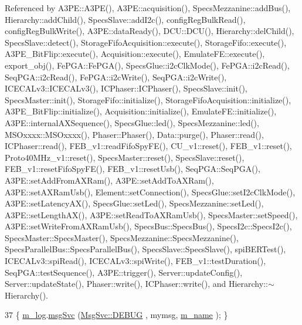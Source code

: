 Referenced by A3\+P\+E\+::\+A3\+P\+E(), A3\+P\+E\+::acquisition(), Specs\+Mezzanine\+::add\+Bus(), Hierarchy\+::add\+Child(), Specs\+Slave\+::add\+I2c(), config\+Reg\+Bulk\+Read(), config\+Reg\+Bulk\+Write(), A3\+P\+E\+::data\+Ready(), D\+C\+U\+::\+D\+C\+U(), Hierarchy\+::del\+Child(), Specs\+Slave\+::detect(), Storage\+Fifo\+Acquisition\+::execute(), Storage\+Fifo\+::execute(), A3\+P\+E\+\_\+\+Bit\+Flip\+::execute(), Acquisition\+::execute(), Emulate\+F\+E\+::execute(), export\+\_\+obj(), Fe\+P\+G\+A\+::\+Fe\+P\+G\+A(), Specs\+Glue\+::i2c\+Clk\+Mode(), Fe\+P\+G\+A\+::i2c\+Read(), Seq\+P\+G\+A\+::i2c\+Read(), Fe\+P\+G\+A\+::i2c\+Write(), Seq\+P\+G\+A\+::i2c\+Write(), I\+C\+E\+C\+A\+Lv3\+::\+I\+C\+E\+C\+A\+Lv3(), I\+C\+Phaser\+::\+I\+C\+Phaser(), Specs\+Slave\+::init(), Specs\+Master\+::init(), Storage\+Fifo\+::initialize(), Storage\+Fifo\+Acquisition\+::initialize(), A3\+P\+E\+\_\+\+Bit\+Flip\+::initialize(), Acquisition\+::initialize(), Emulate\+F\+E\+::initialize(), A3\+P\+E\+::internal\+A\+X\+Sequence(), Specs\+Glue\+::led(), Specs\+Mezzanine\+::led(), M\+S\+Oxxxx\+::\+M\+S\+Oxxxx(), Phaser\+::\+Phaser(), Data\+::purge(), Phaser\+::read(), I\+C\+Phaser\+::read(), F\+E\+B\+\_\+v1\+::read\+Fifo\+Spy\+F\+E(), C\+U\+\_\+v1\+::reset(), F\+E\+B\+\_\+v1\+::reset(), Proto40\+M\+Hz\+\_\+v1\+::reset(), Specs\+Master\+::reset(), Specs\+Slave\+::reset(), F\+E\+B\+\_\+v1\+::reset\+Fifo\+Spy\+F\+E(), F\+E\+B\+\_\+v1\+::reset\+Usb(), Seq\+P\+G\+A\+::\+Seq\+P\+G\+A(), A3\+P\+E\+::set\+Add\+From\+A\+X\+Ram(), A3\+P\+E\+::set\+Add\+To\+A\+X\+Ram(), A3\+P\+E\+::set\+A\+X\+Ram\+Usb(), Element\+::set\+Connection(), Specs\+Glue\+::set\+I2c\+Clk\+Mode(), A3\+P\+E\+::set\+Latency\+A\+X(), Specs\+Glue\+::set\+Led(), Specs\+Mezzanine\+::set\+Led(), A3\+P\+E\+::set\+Length\+A\+X(), A3\+P\+E\+::set\+Read\+To\+A\+X\+Ram\+Usb(), Specs\+Master\+::set\+Speed(), A3\+P\+E\+::set\+Write\+From\+A\+X\+Ram\+Usb(), Specs\+Bus\+::\+Specs\+Bus(), Specs\+I2c\+::\+Specs\+I2c(), Specs\+Master\+::\+Specs\+Master(), Specs\+Mezzanine\+::\+Specs\+Mezzanine(), Specs\+Parallel\+Bus\+::\+Specs\+Parallel\+Bus(), Specs\+Slave\+::\+Specs\+Slave(), spi\+B\+E\+R\+Test(), I\+C\+E\+C\+A\+Lv3\+::spi\+Read(), I\+C\+E\+C\+A\+Lv3\+::spi\+Write(), F\+E\+B\+\_\+v1\+::test\+Duration(), Seq\+P\+G\+A\+::test\+Sequence(), A3\+P\+E\+::trigger(), Server\+::update\+Config(), Server\+::update\+State(), Phaser\+::write(), I\+C\+Phaser\+::write(), and Hierarchy\+::$\sim$\+Hierarchy().


\begin{DoxyCode}
37 \{ \hyperlink{classObject_a0d269813dd7ac1f24bc143031e2963f2}{m\_log}.\hyperlink{classMsgSvc_ad25f18047920cc59a314e5098259711c}{msgSvc} (\hyperlink{classMsgSvc_ae671eb7301996cd049d2da8a65925926a1dbdcc82dce88370ec335883c83b38b0}{MsgSvc::DEBUG}   , mymsg, \hyperlink{classObject_a8b83c95c705d2c3ba0d081fe1710f48d}{m\_name} ); \}
\end{DoxyCode}
\mbox{\label{classObject_a6c9a0397ca804e04d675ed05683f5420}} 
